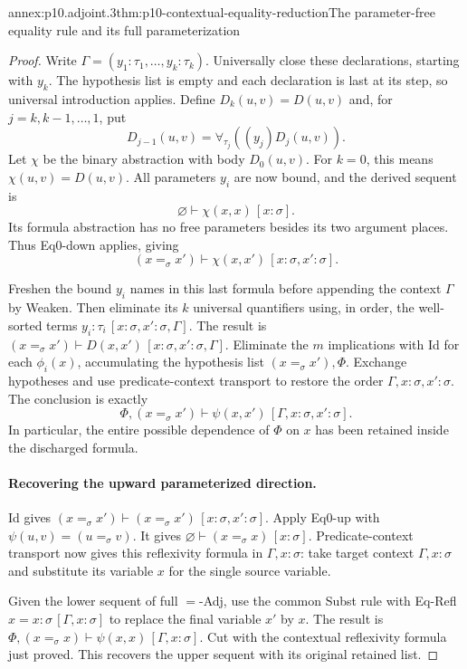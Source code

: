 \begin{annexitem}{annex:p10.adjoint.3}{thm:p10-contextual-equality-reduction}{The parameter-free equality rule and its full parameterization}
\begin{proof}
Write \(\Gamma=(y_1:\tau_1,\ldots,y_k:\tau_k)\).
Universally close these declarations, starting with \(y_k\).
The hypothesis list is empty and each declaration is last at
its step, so universal introduction applies.
Define \(D_k(u,v)=D(u,v)\) and, for
\(j=k,k-1,\ldots,1\), put
\[
             D_{j-1}(u,v)=\forall_{\tau_j}((y_j)D_j(u,v)).
\]
Let \(\chi\) be the binary abstraction with body \(D_0(u,v)\).
For \(k=0\), this means \(\chi(u,v)=D(u,v)\).
All parameters \(y_i\) are now bound, and the derived sequent is
\[
                 \varnothing\vdash\chi(x,x)\,[x:\sigma].
\]
Its formula abstraction has no free parameters besides its two
argument places. Thus Eq0-down applies, giving
\[
            (x=_\sigma x')\vdash\chi(x,x')\,[x:\sigma,x':\sigma].
\]

Freshen the bound \(y_i\) names in this last formula before
appending the context \(\Gamma\) by Weaken.
Then eliminate its \(k\) universal quantifiers using, in order,
the well-sorted terms \(y_i:\tau_i\,[x:\sigma,x':\sigma,\Gamma]\).
The result is
\( (x=_\sigma x')\vdash D(x,x')\,[x:\sigma,x':\sigma,\Gamma]\).
Eliminate the \(m\) implications with Id for each
\(\phi_i(x)\), accumulating the hypothesis list
\((x=_\sigma x'),\Phi\).
Exchange hypotheses and use predicate-context transport to restore
the order \(\Gamma,x:\sigma,x':\sigma\).
The conclusion is exactly
\[
 \Phi,(x=_\sigma x')\vdash
       \psi(x,x')\,[\Gamma,x:\sigma,x':\sigma].
\]
In particular, the entire possible dependence of \(\Phi\) on
\(x\) has been retained inside the discharged formula.

\paragraph{Recovering the upward parameterized direction.}
Id gives
\((x=_\sigma x')\vdash(x=_\sigma x')\,[x:\sigma,x':\sigma]\).
Apply Eq0-up with \(\psi(u,v)=(u=_\sigma v)\).
It gives \(\varnothing\vdash(x=_\sigma x)\,[x:\sigma]\).
Predicate-context transport now gives this reflexivity formula
in \(\Gamma,x:\sigma\): take target context
\(\Gamma,x:\sigma\) and substitute its variable \(x\)
for the single source variable.

Given the lower sequent of full \(=\)-Adj, use the common
Subst rule with Eq-Refl \(x=x:\sigma\,[\Gamma,x:\sigma]\)
to replace the final variable \(x'\) by \(x\).
The result is
\(\Phi,(x=_\sigma x)\vdash\psi(x,x)\,[\Gamma,x:\sigma]\).
Cut with the contextual reflexivity formula just proved.
This recovers the upper sequent with its original retained list.


\end{proof}
\end{annexitem}
